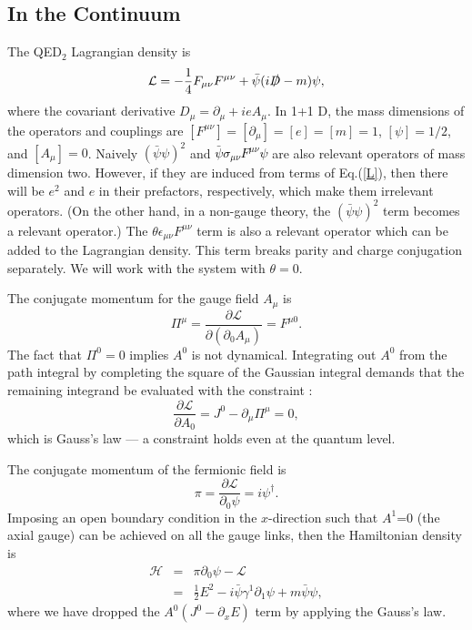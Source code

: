 \documentclass[aps,prd,twocolumn,tightenlines,superscriptaddress,
nofootinbib,preprintnumbers]{revtex4-1}
\newcommand{\Blue}[1]{\textcolor{black}{#1}}
\begin{document}
\subsection{In the Continuum}
The QED$_2$ Lagrangian density is
\begin{equation}
\label{L}
\mathcal{L}=-\frac{1}{4}F_{\mu\nu}F^{\mu\nu}+\bar{\psi}(i \slashed{D}-m)\psi ,
\end{equation}
where the covariant derivative $D_{\mu}=\partial_{\mu}+i e A_{\mu}$. In 1+1 D, the mass dimensions of the operators and couplings are $[F^{\mu\nu}]=[\partial_{\mu}]=[e]=[m]=1$, $[\psi]=1/2$, and $[A_{\mu}]=0$. Naively $(\bar{\psi}\psi)^2$ and \Blue{$\bar{\psi}\sigma_{\mu\nu}F^{\mu\nu}\psi$} are also relevant operators of mass dimension two. However, 
if they are induced from terms of Eq.(\ref{L}), then there will be $e^2$ and $e$ in their prefactors, respectively, which make them irrelevant operators. (On the other hand, 
in a non-gauge theory, the $(\bar{\psi}\psi)^2$ term becomes a relevant operator.) 
The $\theta \epsilon_{\mu\nu}F^{\mu\nu}$ term is also a relevant operator which can be added to the Lagrangian density. This term breaks parity and charge conjugation separately. We will work with the system with $\theta=0$.

The conjugate momentum for the gauge field $A_{\mu}$ is
\begin{equation}
\Pi^{\mu}=\frac{\partial \mathcal{L}}{\partial(\partial_0 A_{\mu})}=F^{\mu 0}.
\end{equation} 
The fact that $\Pi^{0}=0$ implies $A^0$ is not dynamical. Integrating out $A^0$ from the path integral by completing the square of the Gaussian integral demands that the remaining integrand be evaluated with the constraint \cite{Weinberg1995}:
\begin{equation}
\frac{\partial \mathcal{L}}{\partial A_0}=J^0-\partial_{\mu} \Pi^{\mu} =0 ,
\end{equation}
which is Gauss's law --- a constraint holds even at the quantum level. 


The conjugate momentum of the fermionic field is 
\begin{equation}
\pi=\frac{\partial \mathcal{L}}{\partial_0 \psi}=i\psi^{\dagger}.
\end{equation}
Imposing an open boundary condition in the $x$-direction such that $A^1$=0 (the axial gauge) can be achieved on all the gauge links, then the Hamiltonian density is
\begin{eqnarray}
\label{H2}
\mathcal{H}&=&\pi \partial_0 \psi-\mathcal{L} \nonumber \\ 
&=&\frac{1}{2}E^2-i \bar{\psi}\gamma^1 \partial_1 \psi+m \bar{\psi}\psi,
\end{eqnarray}
where we have dropped the $A^0 (J^0-\partial_x E)$ term by applying the Gauss's law.
\end{document}
